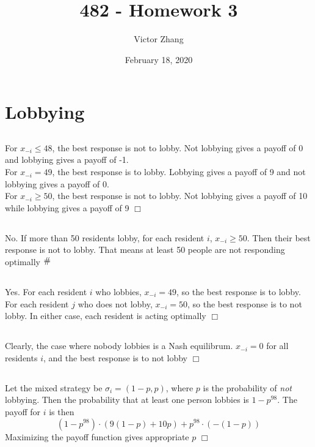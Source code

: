 \documentclass{article}
\title{482 - Homework 3}
\author{Victor Zhang }
\date{February 18, 2020}
\newcommand{\contra}{\raisebox{\depth}{\#}}
\begin{document}
\maketitle

\section{Lobbying}
\subsection{}
For $x_{-i} \leq 48$, the best response is not to lobby. Not lobbying gives a payoff of 0 and lobbying gives a payoff of -1.\\
For $x_{-i} = 49$, the best response is to lobby. Lobbying gives a payoff of 9 and not lobbying gives a payoff of 0.\\
For $x_{-i} \geq 50$, the best response is not to lobby. Not lobbying gives a payoff of 10 while lobbying gives a payoff of 9 $\Box$
\subsection{}
No. If more than 50 residents lobby, for each resident $i$, $x_{-i} \geq 50$. Then their best response is not to lobby. That means at least 50 people are not responding optimally $\contra$
\subsection{}
Yes. For each resident $i$ who lobbies, $x_{-i} = 49$, so the best response is to lobby. For each resident $j$ who does not lobby, $x_{-i} = 50$, so the best response is to not lobby. In either case, each resident is acting optimally $\Box$
\subsection{}
Clearly, the case where nobody lobbies is a Nash equilibrum. $x_{-i} = 0$ for all residents $i$, and the best response is to not lobby $\Box$
\subsection{}
Let the mixed strategy be $\sigma_i = (1-p,p)$, where $p$ is the probability of \textit{not} lobbying. Then the probability that at least one person lobbies is $1-p^{98}$. The payoff for $i$ is then
$$(1- p^{98}) \cdot (9(1-p) + 10p) + p^{98} \cdot (-(1-p))$$
Maximizing the payoff function gives appropriate $p$ $\Box$
\end{document}
